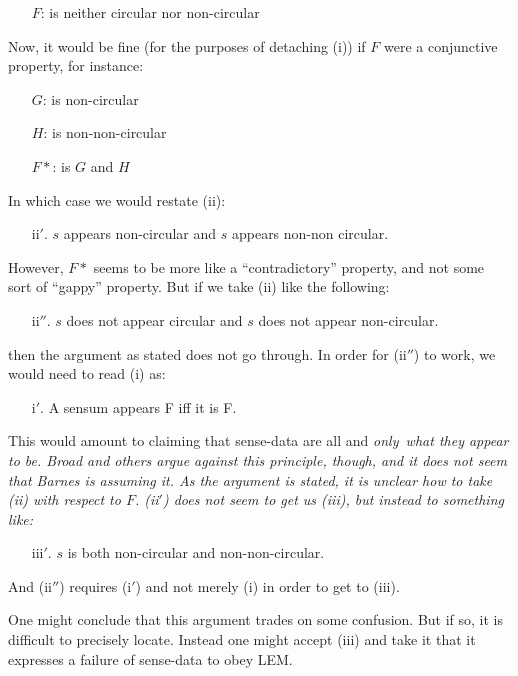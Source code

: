 \begin{enumerate}
\item[] $F$: is neither circular nor non-circular
\end{enumerate}
Now, it would be fine (for the purposes of detaching (i)) if $F$ were a conjunctive property, for instance:

\begin{enumerate}
\item[] $G$: is non-circular
\item[] $H$: is non-non-circular
\item[] $F*$: is $G$ and $H$
\end{enumerate}
In which case we would restate (ii):

\begin{enumerate}
\item[ii$'$.] $s$ appears non-circular and $s$ appears non-non circular.
\end{enumerate}
However, $F*$ seems to be more like a ``contradictory'' property, and not some sort of ``gappy'' property. But if we take (ii) like the following:

\begin{enumerate}
\item[ii$''$.] $s$ does not appear circular and $s$ does not appear non-circular.
\end{enumerate}
then the argument as stated does not go through. In order for (ii$''$) to work, we would need to read (i) as:

\begin{enumerate}
\item[i$'$.] A sensum appears F iff it is F.
\end{enumerate}
This would amount to claiming that sense-data are all and \em only\em\ what they appear to be. Broad \citeyear{Broad:1927} and others argue against this principle, though, and it does not seem that Barnes is assuming it. As the argument is stated, it is unclear how to take (ii) with respect to $F$. (ii$'$) does not seem to get us (iii), but instead to something like:

\begin{enumerate}
\item[iii$'$.] $s$ is both non-circular and non-non-circular.
\end{enumerate}
And (ii$''$) requires (i$'$) and not merely (i) in order to get to (iii). 

One might conclude that this argument trades on some confusion. But if so, it is difficult to precisely locate. Instead one might accept (iii) and take it that it expresses a failure of sense-data to obey LEM. 

